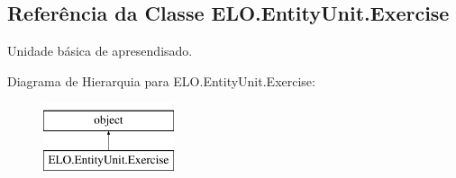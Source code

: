 \hypertarget{classELO_1_1EntityUnit_1_1Exercise}{}\subsection{Referência da Classe E\+L\+O.\+Entity\+Unit.\+Exercise}
\label{classELO_1_1EntityUnit_1_1Exercise}


Unidade básica de apresendisado.  


Diagrama de Hierarquia para E\+L\+O.\+Entity\+Unit.\+Exercise\+:\begin{figure}[H]
\begin{center}
\leavevmode
\includegraphics[height=2.000000cm]{d5/d6a/classELO_1_1EntityUnit_1_1Exercise}
\end{center}
\end{figure}

